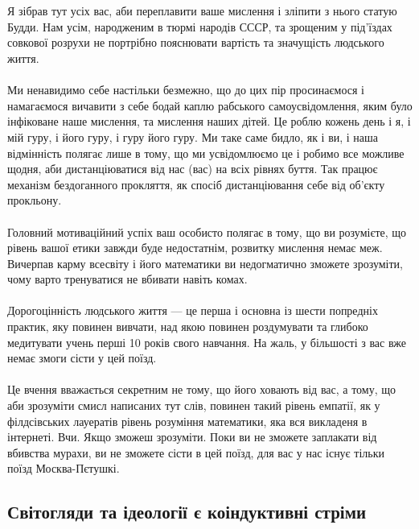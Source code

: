 \\
\\
Я зібрав тут усіх вас, аби переплавити ваше мислення і зліпити з нього статую Будди. Нам усім, народженим
в тюрмі народів СССР, та зрощеним у під'їздах совкової розрухи не портрібно пояснювати вартість
та значущість людського життя.
\\
\\
Ми ненавидимо себе настільки безмежно, що до цих пір просинаємося і намагаємося вичавити з себе
бодай каплю рабського самоусвідомлення, яким було інфіковане наше мислення, та мислення наших дітей.
Це роблю кожень день і я, і мій гуру, і його гуру, і гуру його гуру. Ми таке саме бидло, як і ви,
і наша відмінність полягає лише в тому, що ми усвідомлюємо це і робимо все можливе щодня, аби
дистанціюватися від нас (вас) на всіх рівнях буття. Так працює механізм бездоганного прокляття, як
спосіб дистанціювання себе від об'єкту прокльону.
\\
\\
Головний мотиваційний успіх ваш особисто полягає в тому, що ви розумієте, що рівень вашої етики
завжди буде недостатнім, розвитку мислення немає меж. Вичерпав карму всесвіту і його математики
ви недогматично зможете зрозуміти, чому варто тренуватися не вбивати навіть комах.
\\
\\
Дорогоцінність людського життя --- це перша і основна із шести попредніх практик, яку
повинен вивчати, над якою повинен роздумувати та глибоко медитувати учень перші 10 років свого навчання.
На жаль, у більшості з вас вже немає змоги сісти у цей поїзд.
\\
\\
Це вчення вважається секретним не тому, що його ховають від вас, а тому, що аби зрозуміти
смисл написаних тут слів, повинен такий рівень емпатії, як у філдсівських лауератів рівень розуміння математики,
яка вся викладеня в інтернеті. Вчи. Якщо зможеш зрозуміти.
Поки ви не зможете заплакати від вбивства мурахи, ви не зможете сісти в цей поїзд,
для вас у нас існує тільки поїзд Москва-Пєтушкі.

\subsection{Світогляди та ідеології є коіндуктивні стріми}

